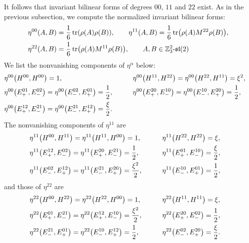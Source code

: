 \documentclass[pdftex]{sigma}
\numberwithin{equation}{section}
\theoremstyle{definition}
\def\sl{\mathfrak{sl}}
\begin{document}
It follows that invariant bilinear forms of degrees $00$, $11$ and $22$ exist.
As in the previous subsection, we compute the normalized invariant bilinear forms:
\begin{align*}
	&\eta^{00}(A,B)= \frac{1}{6}\operatorname{tr}(\rho(A)\rho(B)),\qquad
	\eta^{11}(A,B) = \frac{1}{6}\operatorname{tr}\bigl(\rho(A)M^{22}\rho(B)\bigr),
	\notag \\
&	\eta^{22}(A,B)= \frac{1}{6}\operatorname{tr}\bigl(\rho(A)M^{11}\rho(B)\bigr),\qquad
	A, B \in \mathbb{Z}_3^2\text{-}\sl(2)
\end{align*}
We list the nonvanishing components of $\eta^{\alpha}$ below:
\begin{alignat*}{3}
	&\eta^{00}\bigl(H^{00},H^{00}\bigr)= 1, \qquad&&
	\eta^{00}\bigl(H^{11},H^{22}\bigr)= \eta^{00}\bigl(H^{22},H^{11}\bigr) = \xi^2,&
	\notag \\
	&\eta^{00}\bigl(E_+^{01},E_-^{02}\bigr)= \eta^{00}\bigl(E_-^{02},E_+^{01}\bigr) = \frac{1}{2},
	\qquad &&
	\eta^{00}\bigl(E_+^{20},E_-^{10}\bigr)= \eta^{00}\bigl(E_-^{10},E_+^{20}\bigr) = \frac{1}{2},&
	\notag \\
	&\eta^{00}\bigl(E_+^{12},E_-^{21}\bigr)= \eta^{00}\bigl(E_-^{21},E_+^{12}\bigr) = \frac{\xi}{2}.\qquad &&&
\end{alignat*}
The nonvanishing components of $\eta^{11}$ are
\begin{alignat*}{3}
	&\eta^{11}\bigl(H^{00},H^{11}\bigr)= \eta^{11}\bigl(H^{11},H^{00}\bigr) = 1, \qquad&&
	\eta^{11}\bigl(H^{22},H^{22}\bigr)= \xi,&
	\notag \\
	&\eta^{11}\bigl(E_+^{12},E_-^{02}\bigr)= \eta^{11}\bigl(E_+^{20},E_-^{21}\bigr) = \frac{1}{2},
	\qquad &&
	\eta^{11}\bigl(E_+^{01},E_-^{10}\bigr)= \frac{\xi}{2},&
	\notag \\
	&\eta^{11}\bigl(E_-^{02},E_+^{12}\bigr)= \eta^{11}\bigl(E_-^{21},E_+^{20}\bigr) = \frac{\xi^2}{2}, \qquad &&
	\eta^{11}\bigl(E_-^{10},E_+^{01}\bigr)= \frac{1}{2},&
\end{alignat*}
and those of $\eta^{22}$ are
\begin{alignat*}{3}
	&\eta^{22}\bigl(H^{00}, H^{22}\bigr)= \eta^{22}\bigl(H^{22}, H^{00}\bigr) = 1,
	\qquad&&
	\eta^{22}\bigl(H^{11}, H^{11}\bigr)= \xi,&
	\notag \\
	&\eta^{22}\bigl(E_+^{01}, E_-^{21}\bigr)= \eta^{22}\bigl(E_+^{12}, E_-^{10}\bigr) = \frac{\xi^2}{2},
	\qquad &&
	\eta^{22}\bigl(E_+^{20}, E_-^{02}\bigr)= \frac{1}{2},&
	\notag \\
	&\eta^{22}\bigl(E_-^{21}, E_+^{01}\bigr)= \eta^{22}\bigl(E_-^{10}, E_+^{12}\bigr) = \frac{1}{2},
	\qquad &&
	\eta^{22}\bigl(E_-^{02}, E_+^{20}\bigr)= \frac{\xi}{2}.&
\end{alignat*}
\end{document}
